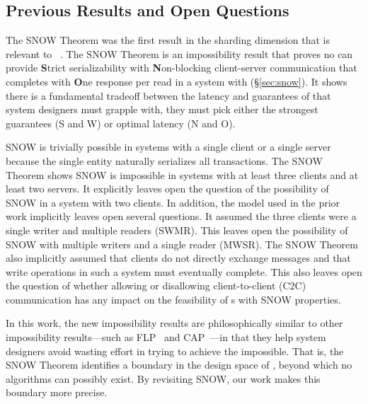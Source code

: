 \subsection{Previous Results and Open Questions}
The SNOW Theorem was the first result in the sharding dimension that is relevant to \rots{}~\cite{SNOW2016}.
The SNOW Theorem is an impossibility result that proves no \rot{} can provide \textbf{S}trict serializability with \textbf{N}on-blocking client-server communication that completes with \textbf{O}ne response per read in a system with \wotsSNOW{} (\S\ref{sec:snow}).
It shows there is a fundamental tradeoff between the latency and guarantees of \rots{} that system designers must grapple with, they must pick either the strongest guarantees (S and W) or optimal latency (N and O).

SNOW is trivially possible in systems with a single client or a single server because the single entity naturally serializes all transactions.
The SNOW Theorem shows SNOW is impossible in systems with at least three clients and at least two servers.
It explicitly leaves open the question of the possibility of SNOW in a system with two clients.
In addition, the model used in the prior work implicitly leaves open several questions.
It assumed the three clients were a single writer and multiple readers (SWMR).
This leaves open the possibility of SNOW with multiple writers and a single reader (MWSR).
The SNOW Theorem also implicitly assumed that clients do not directly exchange messages and that write operations in such a system must eventually complete.
This also leaves open the question of whether allowing or disallowing client-to-client (C2C) communication has any impact on the feasibility of \rot{}s with SNOW properties.

In this work, the new impossibility results %
are philosophically similar to other impossibility results---such as FLP~\cite{Fischer:pds1983} and CAP~\cite{Brewer:pdc2000, Gilbert:sigact2002}---in that they help system designers avoid wasting effort in trying to achieve the impossible. That is, the SNOW Theorem identifies a boundary in the design space of \rots{}, beyond which no algorithms can possibly exist. By revisiting SNOW, our work makes this boundary more precise.



